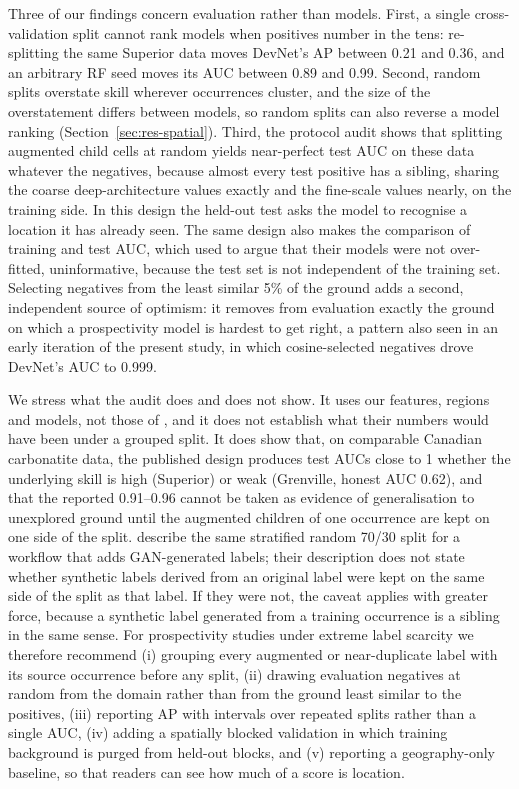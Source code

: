 \documentclass[pdflatex,sn-apa]{sn-jnl}
\begin{document}
Three of our findings concern evaluation rather than models. First, a single cross-validation split cannot rank models when positives number in the tens: re-splitting the same Superior data moves DevNet's AP between 0.21 and 0.36, and an arbitrary RF seed moves its AUC between 0.89 and 0.99. Second, random splits overstate skill wherever occurrences cluster, and the size of the overstatement differs between models, so random splits can also reverse a model ranking (Section~\ref{sec:res-spatial}). Third, the protocol audit shows that splitting augmented child cells at random yields near-perfect test AUC on these data whatever the negatives, because almost every test positive has a sibling, sharing the coarse deep-architecture values exactly and the fine-scale values nearly, on the training side. In this design the held-out test asks the model to recognise a location it has already seen. The same design also makes the comparison of training and test AUC, which \citet{Parsa2024} used to argue that their models were not over-fitted, uninformative, because the test set is not independent of the training set. Selecting negatives from the least similar 5\% of the ground adds a second, independent source of optimism: it removes from evaluation exactly the ground on which a prospectivity model is hardest to get right, a pattern also seen in an early iteration of the present study, in which cosine-selected negatives drove DevNet's AUC to 0.999.

We stress what the audit does and does not show. It uses our features, regions and models, not those of \citet{Parsa2024}, and it does not establish what their numbers would have been under a grouped split. It does show that, on comparable Canadian carbonatite data, the published design produces test AUCs close to 1 whether the underlying skill is high (Superior) or weak (Grenville, honest AUC 0.62), and that the reported 0.91--0.96 cannot be taken as evidence of generalisation to unexplored ground until the augmented children of one occurrence are kept on one side of the split. \citet{Parsa2025} describe the same stratified random 70/30 split for a workflow that adds GAN-generated labels; their description does not state whether synthetic labels derived from an original label were kept on the same side of the split as that label. If they were not, the caveat applies with greater force, because a synthetic label generated from a training occurrence is a sibling in the same sense. For prospectivity studies under extreme label scarcity we therefore recommend (i) grouping every augmented or near-duplicate label with its source occurrence before any split, (ii) drawing evaluation negatives at random from the domain rather than from the ground least similar to the positives, (iii) reporting AP with intervals over repeated splits rather than a single AUC, (iv) adding a spatially blocked validation in which training background is purged from held-out blocks, and (v) reporting a geography-only baseline, so that readers can see how much of a score is location.
\end{document}
